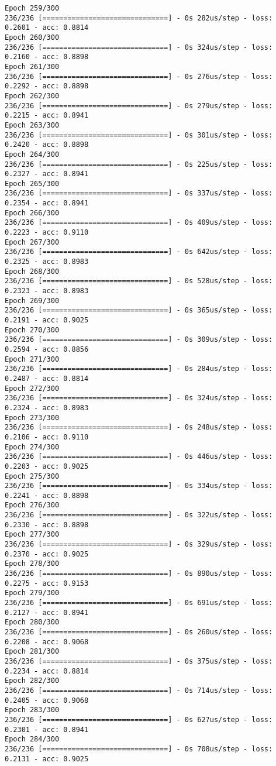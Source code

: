\documentclass[11pt]{article}
\begin{document}
\begin{Verbatim}[commandchars=\\\{\}]
Epoch 259/300
236/236 [==============================] - 0s 282us/step - loss: 0.2601 - acc: 0.8814
Epoch 260/300
236/236 [==============================] - 0s 324us/step - loss: 0.2160 - acc: 0.8898
Epoch 261/300
236/236 [==============================] - 0s 276us/step - loss: 0.2292 - acc: 0.8898
Epoch 262/300
236/236 [==============================] - 0s 279us/step - loss: 0.2215 - acc: 0.8941
Epoch 263/300
236/236 [==============================] - 0s 301us/step - loss: 0.2420 - acc: 0.8898
Epoch 264/300
236/236 [==============================] - 0s 225us/step - loss: 0.2327 - acc: 0.8941
Epoch 265/300
236/236 [==============================] - 0s 337us/step - loss: 0.2354 - acc: 0.8941
Epoch 266/300
236/236 [==============================] - 0s 409us/step - loss: 0.2223 - acc: 0.9110
Epoch 267/300
236/236 [==============================] - 0s 642us/step - loss: 0.2325 - acc: 0.8983
Epoch 268/300
236/236 [==============================] - 0s 528us/step - loss: 0.2323 - acc: 0.8983
Epoch 269/300
236/236 [==============================] - 0s 365us/step - loss: 0.2191 - acc: 0.9025
Epoch 270/300
236/236 [==============================] - 0s 309us/step - loss: 0.2594 - acc: 0.8856
Epoch 271/300
236/236 [==============================] - 0s 284us/step - loss: 0.2487 - acc: 0.8814
Epoch 272/300
236/236 [==============================] - 0s 324us/step - loss: 0.2324 - acc: 0.8983
Epoch 273/300
236/236 [==============================] - 0s 248us/step - loss: 0.2106 - acc: 0.9110
Epoch 274/300
236/236 [==============================] - 0s 446us/step - loss: 0.2203 - acc: 0.9025
Epoch 275/300
236/236 [==============================] - 0s 334us/step - loss: 0.2241 - acc: 0.8898
Epoch 276/300
236/236 [==============================] - 0s 322us/step - loss: 0.2330 - acc: 0.8898
Epoch 277/300
236/236 [==============================] - 0s 329us/step - loss: 0.2370 - acc: 0.9025
Epoch 278/300
236/236 [==============================] - 0s 890us/step - loss: 0.2275 - acc: 0.9153
Epoch 279/300
236/236 [==============================] - 0s 691us/step - loss: 0.2127 - acc: 0.8941
Epoch 280/300
236/236 [==============================] - 0s 260us/step - loss: 0.2208 - acc: 0.9068
Epoch 281/300
236/236 [==============================] - 0s 375us/step - loss: 0.2234 - acc: 0.8814
Epoch 282/300
236/236 [==============================] - 0s 714us/step - loss: 0.2405 - acc: 0.9068
Epoch 283/300
236/236 [==============================] - 0s 627us/step - loss: 0.2301 - acc: 0.8941
Epoch 284/300
236/236 [==============================] - 0s 708us/step - loss: 0.2131 - acc: 0.9025

\end{Verbatim}
\end{document}
